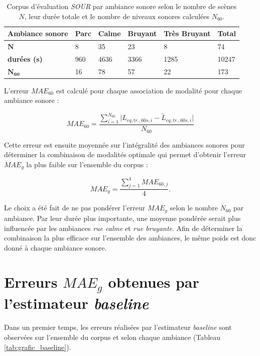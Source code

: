 \begin{table}[h!]
\caption{Corpus d'évaluation \textit{SOUR} par ambiance sonore selon le nombre de scènes $N$, leur durée totale et le nombre de niveaux sonores calculées $N_{60}$.}
\label{tab:resume_sour}
\centering
\begin{tabular}{L{3cm}C{2cm}C{2cm}C{2cm}C{2cm}C{2cm}}
\toprule
\textbf{Ambiance sonore} & \textbf{Parc} & \textbf{Calme} & \textbf{Bruyant} & \textbf{Très Bruyant} & \textbf{Total}\\ \midrule
$\mathbf{N}$ & 8 & 35 & 23 & 8 & 74 \\
\textbf{durées (s)} & 960 & 4636 & 3366 & 1285 & 10247 \\
$\mathbf{N_{60}}$ & 16 & 78 & 57 & 22 & 173 \\ \bottomrule
\end{tabular}
\end{table}

L'erreur $MAE_{60}$ est calculé pour chaque association de modalité pour chaque ambiance sonore : 

\begin{equation}
MAE_{60} = \frac{\sum_{i = 1}^{N_{60}}\vert L_{eq,tr.,60s, i} - \tilde{L}_{eq,tr.,60s, i}\vert}{N_{60}}
\end{equation}

Cette erreur est ensuite moyennée sur l'intégralité des ambiances sonores pour déterminer la combinaison de modalités optimale qui permet d'obtenir l'erreur $MAE_g$ la plus faible sur l'ensemble du corpus :
  
\begin{equation}
MAE_{g} = \frac{\sum_{j = 1}^4 MAE_{60,j}}{4}.
\end{equation}

Le choix a été fait de ne pas pondérer l'erreur $MAE_{g}$ selon le nombre $N_{60}$ par ambiance. Par leur durée plus importante, une moyenne pondérée serait plus influencée par les ambiances \textit{rue calme} et \textit{rue bruyante}. Afin de déterminer la combinaison la plus efficace sur l'ensemble des ambiances, le même poids est donc donné à chaque ambiance sonore.



\section{Erreurs $MAE_g$ obtenues par l'estimateur \textit{baseline}}
Dans un premier temps, les erreurs réalisées par l'estimateur \textit{baseline} sont observées sur l'ensemble du corpus et selon chaque ambiance (Tableau \ref{tab:grafic_baseline}).

